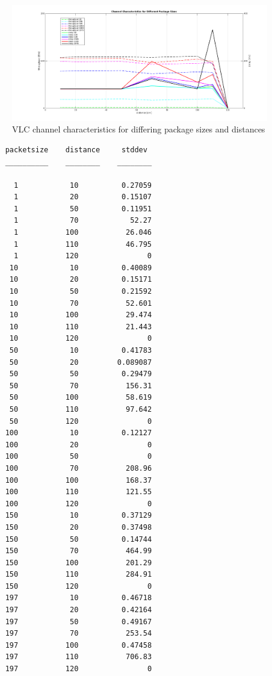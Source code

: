 \begin{figure}[htp]
\centering
\includegraphics[width=\textwidth]{../img/plot_channel-characteristics.png}
\caption{VLC channel characteristics for differing package sizes and distances}
\label{fig:chanchar}
\end{figure}





\begin{verbatim}
    packetsize    distance     stddev 
    __________    ________    ________

      1            10          0.27059
      1            20          0.15107
      1            50          0.11951
      1            70            52.27
      1           100           26.046
      1           110           46.795
      1           120                0
     10            10          0.40089
     10            20          0.15171
     10            50          0.21592
     10            70           52.601
     10           100           29.474
     10           110           21.443
     10           120                0
     50            10          0.41783
     50            20         0.089087
     50            50          0.29479
     50            70           156.31
     50           100           58.619
     50           110           97.642
     50           120                0
    100            10          0.12127
    100            20                0
    100            50                0
    100            70           208.96
    100           100           168.37
    100           110           121.55
    100           120                0
    150            10          0.37129
    150            20          0.37498
    150            50          0.14744
    150            70           464.99
    150           100           201.29
    150           110           284.91
    150           120                0
    197            10          0.46718
    197            20          0.42164
    197            50          0.49167
    197            70           253.54
    197           100          0.47458
    197           110           706.83
    197           120                0
\end{verbatim}